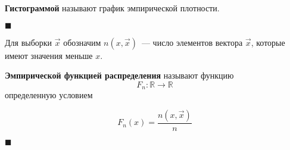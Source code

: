 \textbf{Гистограммой} называют график эмпирической плотности.

$\blacksquare{}$

Для выборки $\vec x$ обозначим $n(x, \vec x)$~--- число элементов вектора $\vec x$, которые имеют значения меньше $x$.

\textbf{Эмпирической функцией распределения} называют функцию
\begin{equation*}
    F_n : \mathbb{R} \to \mathbb{R}
\end{equation*}
определенную условием

\begin{equation*}
    F_n(x) = \frac{n(x, \vec x)}{n}
\end{equation*}

$\blacksquare{}$

